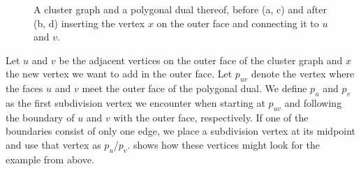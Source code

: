 \begin{figure}[H]
	\centering
	\quad
	\qquad
	\quad
	\caption{A cluster graph and a polygonal dual thereof, before (a, c) and after (b, d) inserting the vertex $x$ on the outer face and connecting it to $u$ and $v$.}
	\label{fig:insert-vertex-outside-example}
\end{figure}

Let $u$ and $v$ be the adjacent vertices on the outer face of the cluster graph and $x$ the new vertex we want to add in the outer face.
Let $p_{uv}$ denote the vertex where the faces $u$ and $v$ meet the outer face of the polygonal dual.
We define $p_u$ and $p_v$ as the first subdivision vertex we encounter when starting at $p_{uv}$ and following the boundary of $u$ and $v$ with the outer face, respectively.
If one of the boundaries consist of only one edge, we place a subdivision vertex at its midpoint and use that vertex as $p_u$/$p_v$.
 shows how these vertices might look for the example from above.
%

